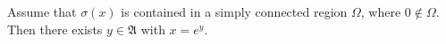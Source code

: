 
Assume that $\sigma(x)$ is contained in a simply connected region $\Omega$, where $0 \notin \Omega$. Then there exists $y \in \mathfrak{A}$ with $x = e^y$.

